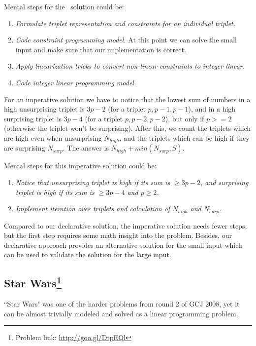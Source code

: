 \documentclass{acm_proc_article-sp}
\begin{document}
Mental steps for the \eclipse\ solution could be:

\begin{enumerate}
\item \textit{Formulate triplet representation and constraints for an individual triplet.}
\item \textit{Code constraint programming model.} 
At this point we can solve the small input and make sure that our implementation is correct.
\item \textit{Apply linearization tricks to convert non-linear constraints to integer linear.}
\item \textit{Code integer linear programming model.}
\end{enumerate}

For an imperative solution we have to notice that the lowest sum of
numbers in a high unsurprising triplet is $3p-2$ (for a triplet $p, p-1, p-1$), 
and in a high surprising triplet is $3p-4$ (for a triplet $p, p-2, p-2$), but only
if $p >= 2$ (otherwise the triplet won't be surprising). After this, we
count the triplets which are high even when unsurprising $N_{high}$,
and the triplets which can be high if they are surprising $N_{surp}$.
The answer is $N_{high} + min(N_{surp}, S)$.

Mental steps for this imperative solution could be:

\begin{enumerate}
\item \textit{Notice that unsurprising triplet is high if its sum is $\geq 3p-2$, and surprising triplet is high if its sum is $\geq 3p-4$ and $p \geq 2$.}
\item \textit{Implement iteration over triplets and calculation of $N_{high}$ and $N_{surp}$.}
\end{enumerate}

Compared to our declarative solution, the imperative solution needs fewer steps, but the first step requires some math insight into the problem.
Besides, our declarative approach provides an alternative solution for the small input which can be used to validate the solution for the large input.

\subsection*{Star Wars\footnote{Problem link: \url{http://goo.gl/DtpEQl}}}
``Star Wars" was one of the harder problems from round 2 of GCJ 2008, yet it can be almost trivially modeled and solved as a linear programming problem.
\end{document}
